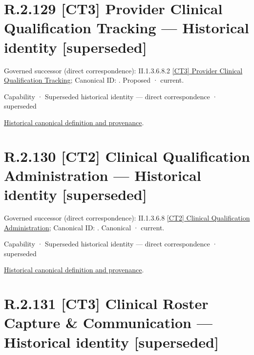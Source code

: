 \section*{R.2.129 [CT3] Provider Clinical Qualification Tracking — Historical identity [superseded]}
\label{navigation:R.2.129}

{\small Governed successor (direct correspondence): II.1.3.6.8.2 \hyperref[element:8fd5c78eba3046fa9153fb4efb44e9c8]{[CT3] Provider Clinical Qualification Tracking}; Canonical ID: \texttt{}. Proposed · current.}\par
\label{element:ab0415e2ea0a4da4ad3dc46997d48bc3}
{\small Capability · Superseded historical identity — direct correspondence · superseded}\par
\href{../../../../../../../continuum/strategy/capability/ab0415e2ea0a4da4ad3dc46997d48bc3.md}{Historical canonical definition and provenance}.\par
\section*{R.2.130 [CT2] Clinical Qualification Administration — Historical identity [superseded]}
\label{navigation:R.2.130}

{\small Governed successor (direct correspondence): II.1.3.6.8 \hyperref[element:0511a705d74a4f48a0ce92590ae764fa]{[CT2] Clinical Qualification Administration}; Canonical ID: \texttt{}. Canonical · current.}\par
\label{element:5fea7aaac4384245b1f08a3d8a076bd9}
{\small Capability · Superseded historical identity — direct correspondence · superseded}\par
\href{../../../../../../../continuum/strategy/capability/5fea7aaac4384245b1f08a3d8a076bd9.md}{Historical canonical definition and provenance}.\par
\section*{R.2.131 [CT3] Clinical Roster Capture \& Communication — Historical identity [superseded]}
\label{navigation:R.2.131}

